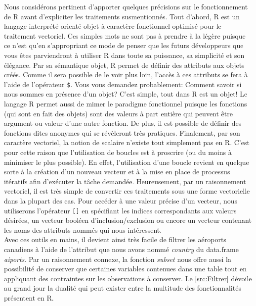 \noindent
Nous considérons pertinent d'apporter quelques précisions sur le fonctionnement de R avant d'expliciter les traitements susmentionnés. Tout d'abord, R est un langage interprété orienté objet à caractère fonctionnel optimisé pour le traitement vectoriel. Ces simples mots ne sont pas à prendre à la légère puisque ce n'est qu'en s'appropriant ce mode de penser que les futurs développeurs que vous êtes parviendront à utiliser R dans toute sa puissance, sa simplicité et son élégance. Par sa sémantique objet, R permet de définir des attributs aux objets créés. Comme il sera possible de le voir plus loin, l'accès à ces attributs se fera à l'aide de l'opérateur \texttt{\$}. Vous vous demandez probablement: Comment savoir si nous sommes en présence d'un objet? C'est simple, tout dans R est un objet! Le langage R permet aussi de mimer le paradigme fonctionnel puisque les fonctions (qui sont en fait des objets) sont des valeurs à part entière qui peuvent être argument ou valeur d'une autre fonction. De plus, il est possible de définir des fonctions dites anonymes qui se révèleront très pratiques. Finalement, par son caractère vectoriel, la notion de scalaire n'existe tout simplement pas en R. C'est pour cette raison que l'utilisation de boucles est à proscrire (ou du moins à minimiser le plus possible). En effet, l'utilisation d'une boucle revient en quelque sorte à la création d'un nouveau vecteur et à la mise en place de processus itératifs afin d'exécuter la tâche demandée. Heureusement, par un raisonnement vectoriel, il est très simple de convertir ces traitements sous une forme vectorielle dans la plupart des cas. \cite{Goulet} Pour accéder à une valeur précise d'un vecteur, nous utiliserons l'opérateur \texttt{[]} en spécifiant les indices correspondants aux valeurs désirées, un vecteur booléen d'inclusion/exclusion ou encore un vecteur contenant les noms des attributs nommés qui nous intéressent. \\

\noindent
Avec ces outils en mains, il devient ainsi très facile de filtrer les aéroports canadiens à l'aide de l'attribut que nous avons nommé \emph{country} du data.frame \emph{aiports}. Par un raisonnement connexe, la fonction \emph{subset} \cite{Rfunction:subset} nous offre aussi la possibilité de conserver que certaines variables contenues dans une table tout en appliquant des contraintes sur les observations à conserver. Le \autoref{src:Filtrer} dévoile au grand jour la dualité qui peut exister entre la multitude des fonctionnalités présentent en R. \\

